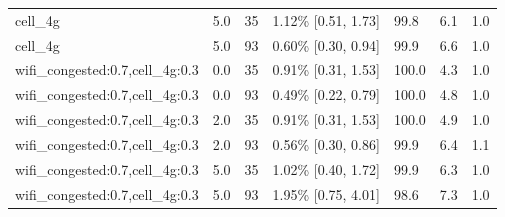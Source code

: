 \begin{table}[t]
\begin{tabular}{lllllll}
cell\_4g & 5.0 & 35 & 1.12\% [0.51, 1.73] & 99.8 & 6.1 & 1.0 \\
cell\_4g & 5.0 & 93 & 0.60\% [0.30, 0.94] & 99.9 & 6.6 & 1.0 \\
wifi\_congested:0.7,cell\_4g:0.3 & 0.0 & 35 & 0.91\% [0.31, 1.53] & 100.0 & 4.3 & 1.0 \\
wifi\_congested:0.7,cell\_4g:0.3 & 0.0 & 93 & 0.49\% [0.22, 0.79] & 100.0 & 4.8 & 1.0 \\
wifi\_congested:0.7,cell\_4g:0.3 & 2.0 & 35 & 0.91\% [0.31, 1.53] & 100.0 & 4.9 & 1.0 \\
wifi\_congested:0.7,cell\_4g:0.3 & 2.0 & 93 & 0.56\% [0.30, 0.86] & 99.9 & 6.4 & 1.1 \\
wifi\_congested:0.7,cell\_4g:0.3 & 5.0 & 35 & 1.02\% [0.40, 1.72] & 99.9 & 6.3 & 1.0 \\
wifi\_congested:0.7,cell\_4g:0.3 & 5.0 & 93 & 1.95\% [0.75, 4.01] & 98.6 & 7.3 & 1.0 \\
\bottomrule
\end{tabular}
\end{table}
